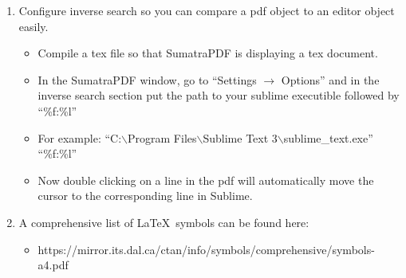 \documentclass{article}
\begin{document}
\begin{enumerate}
	\begin{itemize}
	\item https://github.com/LaTeXing/LaTeX-cwl
	\item https://github.com/randy3k/LaTeXYZ
	\end{itemize}
\item Configure inverse search so you can compare a pdf object to an editor object easily.
	\begin{itemize}
	\item Compile a tex file so that SumatraPDF is displaying a tex document.
	\item In the SumatraPDF window, go to ``Settings $\rightarrow$ Options'' and in the inverse search section put the path to your sublime executible followed by ``\%f:\%l''
	\item For example: ``C:$ \backslash $Program Files$ \backslash $Sublime Text 3$ \backslash $sublime\_text.exe'' ``\%f:\%l''
	\item Now double clicking on a line in the pdf will automatically move the cursor to the corresponding line in Sublime.
	\end{itemize}
\item A comprehensive list of \LaTeX \ symbols can be found here:
	\begin{itemize}
	\item https://mirror.its.dal.ca/ctan/info/symbols/comprehensive/symbols-a4.pdf
	\end{itemize}
\end{enumerate}
\end{document}
